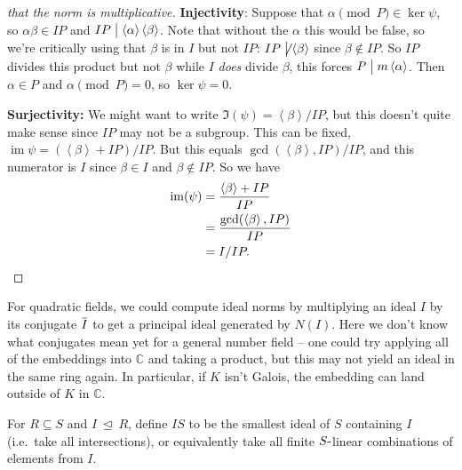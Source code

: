 \begin{proof}[that the norm is multiplicative]
\hfill\break

\textbf{Injectivity}: Suppose that \(\alpha\pmod P \in \ker \psi\), so
\(\alpha \beta\in IP\) and
\(IP \bigm|\left\langle{ \alpha }\right\rangle \left\langle{ \beta }\right\rangle\).
Note that without the \(\alpha\) this would be false, so we're
critically using that \(\beta\) is in \(I\) but not \(IP\):
\(IP\not\bigm|\left\langle{ \beta }\right\rangle\) since
\(\beta \not\in IP\). So \(IP\) divides this product but not \(\beta\)
while \(I\) \emph{does} divide \(\beta\), this forces
\(P\bigm|m \left\langle{ \alpha }\right\rangle\). Then \(\alpha\in P\)
and \(\alpha\pmod P = 0\), so \(\ker \psi = 0\).

\hfill\break

\textbf{Surjectivity:} We might want to write
\(\Im(\psi) = \left\langle{ \beta }\right\rangle / IP\), but this
doesn't quite make sense since \(IP\) may not be a subgroup. This can be
fixed,
\(\operatorname{im}\psi = ( \left\langle{ \beta }\right\rangle + IP) / IP\).
But this equals \(\gcd( \left\langle{ \beta }\right\rangle, IP ) / IP\),
and this numerator is \(I\) since \(\beta\in I\) and
\(\beta\not\in IP\). So we have
\begin{align*}
\operatorname{im}(\psi) 
&= {\left\langle{ \beta }\right\rangle + IP \over  IP } \\
&= { \gcd( \left\langle{ \beta }\right\rangle, IP ) \over IP } \\
&= I/IP
.\end{align*}

\end{proof}

\begin{remark}

For quadratic fields, we could compute ideal norms by multiplying an
ideal \(I\) by its conjugate
\(\mkern 1.5mu\overline{\mkern-1.5muI\mkern-1.5mu}\mkern 1.5mu\) to get
a principal ideal generated by \(N(I)\). Here we don't know what
conjugates mean yet for a general number field -- one could try applying
all of the embeddings into \({\mathbb{C}}\) and taking a product, but
this may not yield an ideal in the same ring again. In particular, if
\(K\) isn't Galois, the embedding can land outside of \(K\) in
\({\mathbb{C}}\).

\end{remark}

\begin{definition}

For \(R \subseteq S\) and \(I{~\trianglelefteq~}R\), define \(IS\) to be
the smallest ideal of \(S\) containing \(I\) (i.e.~take all
intersections), or equivalently take all finite \(S{\hbox{-}}\)linear
combinations of elements from \(I\).

\end{definition}

